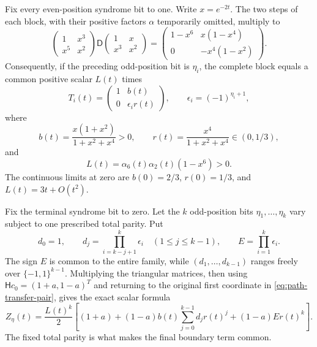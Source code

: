 Fix every even-position syndrome bit to one. Write $x=e^{-2t}$.
The two steps of each block, with their positive factors $\alpha$
temporarily omitted, multiply to
\begin{equation}\label{eq:path-triangular}
 \begin{pmatrix}1&x^3\\x^5&x^2\end{pmatrix}
 \mathsf D
 \begin{pmatrix}1&x\\x^3&x^2\end{pmatrix}
 =\begin{pmatrix}1-x^6&x(1-x^4)\\0&-x^4(1-x^2)\end{pmatrix}.
\end{equation}
Consequently, if the preceding odd-position bit is $\eta_i$, the
complete block equals a common positive scalar $L(t)$ times
\[
 T_i(t)=\begin{pmatrix}1&b(t)\\0&\epsilon_i r(t)\end{pmatrix},
 \qquad \epsilon_i=(-1)^{\eta_i+1},
\]
where
\begin{equation}\label{eq:path-ratio}
 b(t)=\frac{x(1+x^2)}{1+x^2+x^4}>0,\qquad
 r(t)=\frac{x^4}{1+x^2+x^4}\in(0,1/3),
\end{equation}
and
\[
 L(t)=\alpha_6(t)\alpha_2(t)(1-x^6)>0.
\]
The continuous limits at zero are $b(0)=2/3$, $r(0)=1/3$, and
$L(t)=3t+O(t^2)$.

Fix the terminal syndrome bit to zero. Let the $k$ odd-position bits
$\eta_1,\ldots,\eta_k$ vary subject to one prescribed total parity.
Put
\[
 d_0=1,\qquad
 d_j=\prod_{i=k-j+1}^k\epsilon_i\quad(1\le j\le k-1),\qquad
 E=\prod_{i=1}^k\epsilon_i.
\]
The sign $E$ is common to the entire family, while
$(d_1,\ldots,d_{k-1})$ ranges freely over $\{-1,1\}^{k-1}$.
Multiplying the triangular matrices, then using
$\mathsf Hc_0=(1+a,1-a)^T$ and returning to the original first
coordinate in \eqref{eq:path-transfer-pair}, gives the exact scalar
formula
\begin{equation}\label{eq:path-scalar-digits}
 Z_\eta(t)=\frac{L(t)^k}{2}
 \left[(1+a)+(1-a)b(t)\sum_{j=0}^{k-1}d_jr(t)^j
                     +(1-a)E r(t)^k\right].
\end{equation}
The fixed total parity is what makes the final boundary term common.

